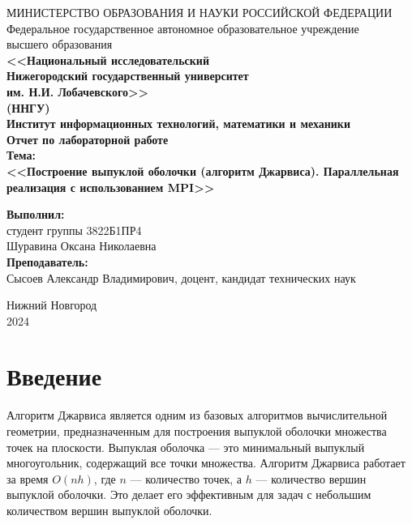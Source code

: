 \documentclass[12pt]{article}
\begin{document}
\begin{center}
МИНИСТЕРСТВО ОБРАЗОВАНИЯ И НАУКИ РОССИЙСКОЙ ФЕДЕРАЦИИ \\
Федеральное государственное автономное образовательное учреждение \\
высшего образования \\ \textbf{<<Национальный исследовательский \\ Нижегородский государственный университет \\
им. Н.И. Лобачевского>>} \\
\textbf{(ННГУ)} \\[0.5cm]
\textbf{Институт информационных технологий, математики и механики} \\[4.5cm]

\textbf{\large Отчет по лабораторной работе} \\[0.6cm]
\textbf{Тема:} \\
\textbf{\large <<Построение выпуклой оболочки (алгоритм Джарвиса). Параллельная реализация с использованием MPI>>} \\[5.0cm]
\begin{flushright}
\begin{minipage}{0.40\textwidth}
\begin{flushleft}
\textbf{Выполнил:} \\[0.1cm]
студент группы 3822Б1ПР4 \\
Шуравина Оксана Николаевна \\[1.0cm]
\textbf{Преподаватель:} \\[0.1cm]
Сысоев Александр Владимирович, доцент, кандидат технических наук \\
\end{flushleft}
\end{minipage}
\end{flushright}
\vfill

Нижний Новгород \\
2024

\thispagestyle{empty}

\end{center}

\newpage
\section*{Введение}
Алгоритм Джарвиса является одним из базовых алгоритмов вычислительной геометрии, предназначенным для построения выпуклой оболочки множества точек на плоскости. Выпуклая оболочка — это минимальный выпуклый многоугольник, содержащий все точки множества. Алгоритм Джарвиса работает за время \( O(nh) \), где \( n \) — количество точек, а \( h \) — количество вершин выпуклой оболочки. Это делает его эффективным для задач с небольшим количеством вершин выпуклой оболочки.
\end{document}
